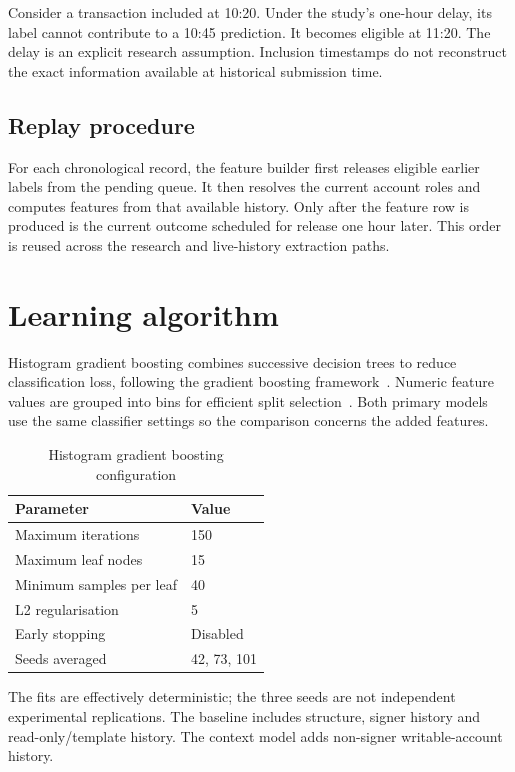 \documentclass[12pt,a4paper,oneside]{report}
\begin{document}
Consider a transaction included at 10:20. Under the study's one-hour delay, its label cannot contribute to a 10:45 prediction. It becomes eligible at 11:20. The delay is an explicit research assumption. Inclusion timestamps do not reconstruct the exact information available at historical submission time.
\subsection{Replay procedure}
For each chronological record, the feature builder first releases eligible earlier labels from the pending queue. It then resolves the current account roles and computes features from that available history. Only after the feature row is produced is the current outcome scheduled for release one hour later. This order is reused across the research and live-history extraction paths.

\section{Learning algorithm}
Histogram gradient boosting combines successive decision trees to reduce classification loss, following the gradient boosting framework~\cite{friedman}. Numeric feature values are grouped into bins for efficient split selection~\cite{hgb}. Both primary models use the same classifier settings so the comparison concerns the added features.
\begin{table}[ht]\centering\caption{Histogram gradient boosting configuration}
\begin{tabular}{ll}\toprule Parameter&Value\\\midrule Maximum iterations&150\\Maximum leaf nodes&15\\Minimum samples per leaf&40\\L2 regularisation&5\\Early stopping&Disabled\\Seeds averaged&42, 73, 101\\\bottomrule\end{tabular}\end{table}
The fits are effectively deterministic; the three seeds are not independent experimental replications. The baseline includes structure, signer history and read-only/template history. The context model adds non-signer writable-account history.
\end{document}
